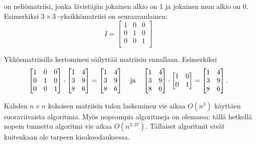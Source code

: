 
 on neliömatriisi,
jonka lävistäjän jokainen alkio on 1
ja jokainen muu alkio on 0.
Esimerkiksi $3 \times 3$ -yksikkömatriisi on
seuraavanlainen:
\[
 I = \begin{bmatrix}
  1 & 0 & 0 \\
  0 & 1 & 0 \\
  0 & 0 & 1 \\
 \end{bmatrix}
\]

\begin{samepage}
Ykkösmatriisilla kertominen säilyttää matriisin
ennallaan. Esimerkiksi
\[
 \begin{bmatrix}
  1 & 0 & 0 \\
  0 & 1 & 0 \\
  0 & 0 & 1 \\
 \end{bmatrix}
\cdot
 \begin{bmatrix}
  1 & 4 \\
  3 & 9 \\
  8 & 6 \\
 \end{bmatrix}
=
 \begin{bmatrix}
  1 & 4 \\
  3 & 9 \\
  8 & 6 \\
 \end{bmatrix} \hspace{10px} \textrm{ja} \hspace{10px}
 \begin{bmatrix}
  1 & 4 \\
  3 & 9 \\
  8 & 6 \\
 \end{bmatrix}
\cdot
 \begin{bmatrix}
  1 & 0 \\
  0 & 1 \\
 \end{bmatrix}
=
 \begin{bmatrix}
  1 & 4 \\
  3 & 9 \\
  8 & 6 \\
 \end{bmatrix}.
\]
\end{samepage}

Kahden $n \times n$ kokoisen matriisin tulon
laskeminen vie aikaa $O(n^3)$
käyttäen suoraviivaista algoritmia.
Myös nopeampia algoritmeja on olemassa:
tällä hetkellä nopein tunnettu algoritmi
vie aikaa $O(n^{2{,}37})$.
Tällaiset algoritmit eivät kuitenkaan
ole tarpeen kisakoodauksessa.

